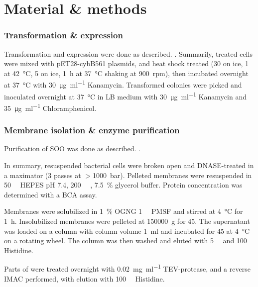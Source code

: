 \twocolumn

\part{Material \& methods}


\section{Transformation \& expression}

Transformation and expression were done as described.
\cite{superoxide_salvaging}. Summarily,  treated cells were mixed
with pET28-cybB561 plasmids, and heat shock treated (\SI{30}{\min} on ice,
\SI{1}{\min} at \SI{42}{\celsius}, \SI{5}{\min} on ice, \SI{1}{\hour} at
\SI{37}{\celsius} shaking at \SI{900}{rpm}), then incubated overnight at
\SI{37}{\celsius} with \SI{30}{\ug\per\ml} Kanamycin. Transformed colonies were
picked and inoculated overnight at \SI{37}{\celsius} in LB medium with
\SI{30}{\ug\per\ml} Kanamycin and \SI{35}{\ug\per\ml} Chloramphenicol.


\section{Membrane isolation \& enzyme purification}

Purification of SOO was done as described. \cite{superoxide_salvaging}.

In summary, resuspended bacterial cells were broken open and DNASE-treated in a
maximator (3 passes at $>$\SI{1000}{\bar}). Pelleted membranes were resuspended
in \SI{50}{\milli\Molar} HEPES pH 7.4, \SI{200}{\milli\Molar} ,
\SI{7.5}{\percent} glycerol buffer. Protein concentration was determined with a
BCA assay.

Membranes were solubilized in \SI{1}{\percent} OGNG \SI{1}{\milli\Molar} PMSF
and stirred at \SI{4}{\celsius} for \SI{1}{\hour}. Insolubilized membranes were
pelleted at \SI{150000}{g} for \SI{45}{\min}. The supernatant was loaded on a
 column with column volume \SI{1}{\ml} and incubated for
\SI{45}{\min} at \SI{4}{\celsius} on a rotating wheel. The column was then
washed and eluted with \SI{5}{\milli\Molar} and \SI{100}{\milli\Molar}
Histidine.

Parts of \hsdsred{} were treated overnight with \SI{0.02}{\mg\per\ml}
TEV-protease, and a reverse  IMAC performed, with elution with
\SI{100}{\milli\Molar} Histidine.

